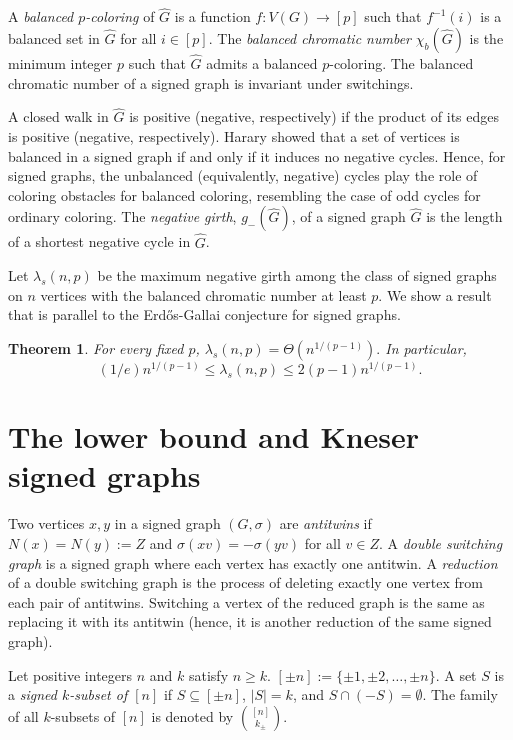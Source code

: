 \documentclass{article}
\newtheorem{theorem}{Theorem}[section]
\begin{document}
A \emph{balanced $p$-coloring} of $\widehat{G}$ is a function $f:V(G)\to[p]$ such that $f^{-1}(i)$ is a balanced set in $\widehat{G}$ for all $i\in [p]$. The \emph{balanced chromatic number} $\chi_b(\widehat{G})$ is the minimum integer $p$ such that $\widehat{G}$ admits a balanced $p$-coloring. The balanced chromatic number of a signed graph is invariant under switchings.

A closed walk in $\widehat{G}$ is positive (negative, respectively) if the product of its edges is positive (negative, respectively). Harary\cite{H53} showed that a set of vertices is balanced in a signed graph if and only if it induces no negative cycles. Hence, for signed graphs, the unbalanced (equivalently, negative) cycles play the role of coloring obstacles for balanced coloring, resembling the case of odd cycles for ordinary coloring. The \emph{negative girth}, $g_-(\widehat{G})$, of a signed graph $\widehat{G}$ is the length of a shortest negative cycle in $\widehat{G}$.

Let $\lambda_s(n,p)$ be the maximum negative girth among the class of signed graphs on $n$ vertices with the balanced chromatic number at least $p$. We show a result that is parallel to the Erd\H{o}s-Gallai conjecture for signed graphs.

\begin{theorem}\label{thm:signedErdosGallai}
    For every fixed $p$, $\lambda_s(n,p)=\Theta(n^{1/(p-1)}).$ In particular,
    $$(1/e)n^{1/(p-1)} \leq \lambda_s(n,p)\leq 2(p-1) n^{1/(p-1)}.$$
\end{theorem}




\section{The lower bound and Kneser signed graphs}
Two vertices $x,y$ in a signed graph $(G,\sigma)$ are \emph{antitwins} if $N(x)=N(y):=Z$ and $\sigma(xv)=-\sigma(yv)$ for all $v\in Z$. A \emph{double switching graph} is a signed graph where each vertex has exactly one antitwin. A \emph{reduction} of a double switching graph is the process of deleting exactly one vertex from each pair of antitwins. Switching a vertex of the reduced graph is the same as replacing it with its antitwin (hence, it is another reduction of the same signed graph).

Let positive integers $n$ and $k$ satisfy $n\geq k$. $[\pm n]:=\{\pm 1,\pm 2,\ldots,\pm n\}$. A set $S$ is a \emph{signed $k$-subset of $[n]$} if $S\subseteq[\pm n]$, $|S|={k}$, and $S\cap (-S)=\emptyset$. The family of all $k$-subsets of $[n]$ is denoted by $\binom{[n]}{k_{\pm}}$.
\end{document}
